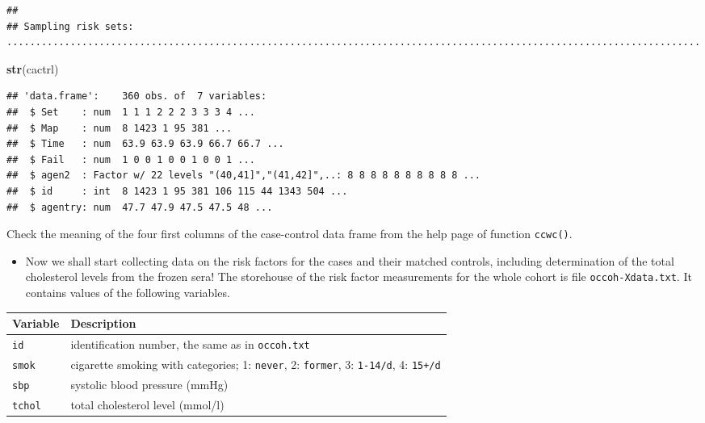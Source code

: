 \documentclass[
]{book}
\newenvironment{Shaded}{\begin{snugshade}}{\end{snugshade}}
\newcommand{\FunctionTok}[1]{\textcolor[rgb]{0.13,0.29,0.53}{\textbf{#1}}}
\newcommand{\NormalTok}[1]{#1}
\newcounter{none} %
\providecommand{\tightlist}{%
  \setlength{\itemsep}{0pt}\setlength{\parskip}{0pt}}
\theoremstyle{definition}
\theoremstyle{definition}
\theoremstyle{definition}
\theoremstyle{definition}
\theoremstyle{remark}
\begin{document}
\begin{verbatim}
## 
## Sampling risk sets: ........................................................................................................................
\end{verbatim}

\begin{Shaded}
\begin{Highlighting}[]
\FunctionTok{str}\NormalTok{(cactrl)}
\end{Highlighting}
\end{Shaded}

\begin{verbatim}
## 'data.frame':    360 obs. of  7 variables:
##  $ Set    : num  1 1 1 2 2 2 3 3 3 4 ...
##  $ Map    : num  8 1423 1 95 381 ...
##  $ Time   : num  63.9 63.9 63.9 66.7 66.7 ...
##  $ Fail   : num  1 0 0 1 0 0 1 0 0 1 ...
##  $ agen2  : Factor w/ 22 levels "(40,41]","(41,42]",..: 8 8 8 8 8 8 8 8 8 8 ...
##  $ id     : int  8 1423 1 95 381 106 115 44 1343 504 ...
##  $ agentry: num  47.7 47.9 47.5 47.5 48 ...
\end{verbatim}

Check the meaning of the four first columns of the case-control
data frame from the help page of function \texttt{ccwc()}.

\begin{itemize}
\tightlist
\item
  Now we shall start collecting data on the
  risk factors for the cases and their
  matched controls, including determination of the total cholesterol
  levels from the frozen sera! The storehouse of the risk factor measurements for
  the whole cohort is file \texttt{occoh-Xdata.txt}. It contains
  values of the following variables.
\end{itemize}

{\def\LTcaptype{none} %
\begin{longtable}[]{@{}
  >{\raggedright\arraybackslash}p{}
  >{\raggedright\arraybackslash}p{}@{}}
\toprule\noalign{}
\begin{minipage}[b]{\linewidth}\raggedright
Variable
\end{minipage} & \begin{minipage}[b]{\linewidth}\raggedright
Description
\end{minipage} \\
\midrule\noalign{}
\endhead
\bottomrule\noalign{}
\endlastfoot
\texttt{id} & identification number, the same as in \texttt{occoh.txt} \\
\texttt{smok} & cigarette smoking with categories; 1: \texttt{never}, 2: \texttt{former}, 3: \texttt{1-14/d}, 4: \texttt{15+/d} \\
\texttt{sbp} & systolic blood pressure (mmHg) \\
\texttt{tchol} & total cholesterol level (mmol/l) \\
\end{longtable}
}
\end{document}
